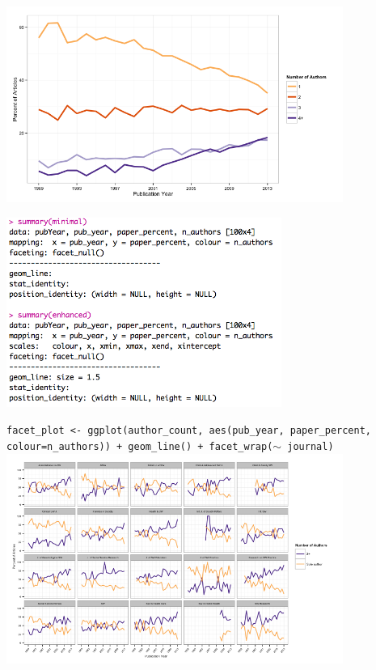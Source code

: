 \documentclass{beamer}
\begin{document}
\begin{frame}
\includegraphics[width=110mm,scale=0.5]{enhanced.png}
\end{frame}



\begin{frame}
\includegraphics[width=90mm,scale=0.5]{authorhood.png}
\end{frame}


\begin{frame}
\footnotesize \texttt{facet\_plot <- ggplot(author\_count, aes(pub\_year, paper\_percent, colour=n\_authors)) + 
  geom\_line() + facet\_wrap($\sim$ journal)} 
\includegraphics[width=110mm,scale=0.5]{facetplot.png}
\end{frame}



	
\end{document}
